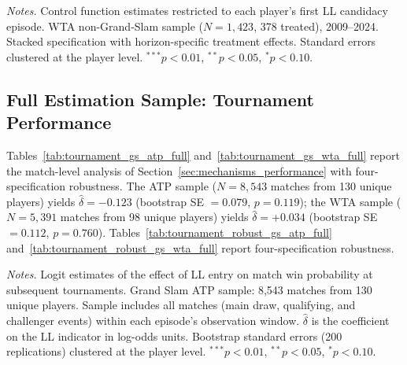 \begin{table}[htbp]
\centering
\caption{WTA Non-Grand-Slam: First LL Episode Only (Control Function)}
\label{tab:firstll_nongs_wta}
\begin{threeparttable}
\small

\begin{tablenotes}
\footnotesize
\item \textit{Notes.} Control function estimates restricted to each player's first LL candidacy episode. WTA non-Grand-Slam sample ($N = 1{,}423$, 378 treated), 2009--2024. Stacked specification with horizon-specific treatment effects. Standard errors clustered at the player level. $^{***}p<0.01$, $^{**}p<0.05$, $^{*}p<0.10$.
\end{tablenotes}
\end{threeparttable}
\end{table}

\subsection{Full Estimation Sample: Tournament Performance}
\label{app:fullsample_tournament}

Tables~\ref{tab:tournament_gs_atp_full} and~\ref{tab:tournament_gs_wta_full} report the match-level analysis of Section~\ref{sec:mechanisms_performance} with four-specification robustness. The ATP sample ($N = 8{,}543$ matches from 130 unique players) yields $\hat{\delta} = -0.123$ (bootstrap SE $= 0.079$, $p = 0.119$); the WTA sample ($N = 5{,}391$ matches from 98 unique players) yields $\hat{\delta} = +0.034$ (bootstrap SE $= 0.112$, $p = 0.760$). Tables~\ref{tab:tournament_robust_gs_atp_full} and~\ref{tab:tournament_robust_gs_wta_full} report four-specification robustness.

\begin{table}[htbp]
\centering
\caption{Grand Slam Tournament Performance: ATP (Full Sample)}
\label{tab:tournament_gs_atp_full}
\begin{threeparttable}
\small

\begin{tablenotes}
\footnotesize
\item \textit{Notes.} Logit estimates of the effect of LL entry on match win probability at subsequent tournaments. Grand Slam ATP sample: 8,543 matches from 130 unique players. Sample includes all matches (main draw, qualifying, and challenger events) within each episode's observation window. $\hat{\delta}$ is the coefficient on the LL indicator in log-odds units. Bootstrap standard errors (200 replications) clustered at the player level. $^{***}p<0.01$, $^{**}p<0.05$, $^{*}p<0.10$.
\end{tablenotes}
\end{threeparttable}
\end{table}


